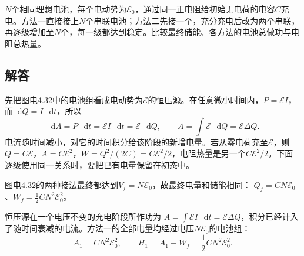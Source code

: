 \documentclass[UTF8,fontset=fandol,a4paper,11pt]{ctexart}
\newcommand{\dd}{\mathop{}\!\mathrm{d}}
\newcommand{\figcaption}[1]{\par\vspace{2pt}{\small\color{muted}#1}\par}
\begin{document}
$N$个相同理想电池，每个电动势为$\mathcal E_0$，通过同一正电阻给初始无电荷的电容$C$充电。方法一直接接上$N$个串联电池；方法二先接一个，充分充电后改为两个串联，再逐级增加至$N$个，每一级都达到稳定。比较最终储能、各方法的电池总做功与电阻总热量。

\begin{center}\begin{minipage}{.98\linewidth}\centering
{}
\figcaption{图电4.32\quad 同一电容及电阻，改变接入电池数}
\end{minipage}\end{center}

\subsection*{解答}

先把图电4.32中的电池组看成电动势为$\mathcal E$的恒压源。在任意微小时间内，$P=\mathcal E I$，而$\dd Q=I\,\dd t$，所以
\[
\dd A=P\,\dd t=\mathcal E I\,\dd t=\mathcal E\,\dd Q,
\qquad A=\int\mathcal E\,\dd Q=\mathcal E\Delta Q.
\]
电流随时间减小，对它的时间积分给该阶段的新增电量。若从零电荷充至$\mathcal E$，则$Q=C\mathcal E$，$A=C\mathcal E^2$，$W=Q^2/(2C)=C\mathcal E^2/2$，电阻热量是另一个$C\mathcal E^2/2$。下面逐级使用同一关系时，要把已有电量保留在初态中。

图电4.32的两种接法最终都达到$V_f=N\mathcal E_0$，故最终电量和储能相同：
$Q_f=CN\mathcal E_0$、$W_f=\tfrac12CN^2\mathcal E_0^2$。

恒压源在一个电压不变的充电阶段所作功为
$A=\int\mathcal E I\,\dd t=\mathcal E\Delta Q$，积分已经计入了随时间衰减的电流。方法一的全部电量均经过电压$N\mathcal E_0$的电池组：
\[
A_1=CN^2\mathcal E_0^2,\qquad
\boxed{H_1=A_1-W_f=\frac12CN^2\mathcal E_0^2}.
\]
\end{document}
